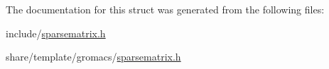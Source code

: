 \-The documentation for this struct was generated from the following files\-:\begin{DoxyCompactItemize}
\item 
include/\hyperlink{include_2sparsematrix_8h}{sparsematrix.\-h}\item 
share/template/gromacs/\hyperlink{share_2template_2gromacs_2sparsematrix_8h}{sparsematrix.\-h}\end{DoxyCompactItemize}
